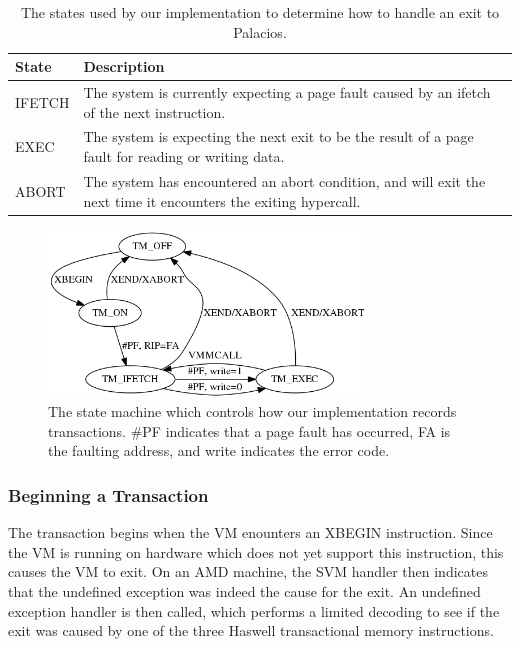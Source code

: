 \documentclass{acm_proc_article-sp}
\begin{document}
\begin{table}
\begin{center}
    \begin{tabular}{| l | l |}
    \hline
    State & Description \\
    \hline
    IFETCH & The system is currently expecting a page fault caused by an ifetch
                of the next instruction. \\
    \hline
    EXEC & The system is expecting the next exit to be the result of a page fault for
                reading or writing data. \\
    \hline
    ABORT & The system has encountered an abort condition, and will exit the next time
                it encounters the exiting hypercall. \\
    \hline 
    \end{tabular}
    \caption{The states used by our implementation to determine how to handle an exit
             to Palacios.}
\label{statetable}
\end{center}
\end{table}


\begin{figure}[t]
\centering
\includegraphics[height=1.75in]{figs/fsm.png}
\caption{The state machine which controls how our implementation records 
transactions. \#PF indicates that a page fault has occurred, FA is the faulting
address, and write indicates the error code.}
\label{flowchart}
\end{figure}
\subsubsection{Beginning a Transaction}

The transaction begins when the VM enounters an XBEGIN instruction. Since the 
VM is running on hardware which does not yet support this instruction, this
causes the VM to exit. On an AMD machine, the SVM handler then indicates that
the undefined exception was indeed the cause for the exit. An undefined 
exception handler is then called, which performs a limited decoding to see
if the exit was caused by one of the three Haswell transactional memory
instructions.    
\end{document}
